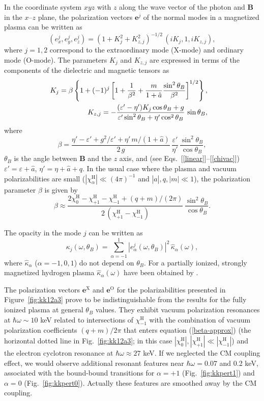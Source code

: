 \documentclass{emulateapj}
\newcommand{\beq}{\begin{equation}}
\newcommand{\eeq}{\end{equation}}
\newcommand{\bea}{\begin{eqnarray}}
\newcommand{\eea}{\end{eqnarray}}
\newcommand{\req}[1]{equation (\ref{#1})}
\newcommand{\chiH}{\chi^\mathrm{H}}
\newcommand{\eX}{\bm{e}^\mathrm{X}}
\newcommand{\eO}{\bm{e}^\mathrm{O}}
\begin{document}
In the coordinate system $xyz$ with $z$ along the wave vector 
of the photon
and $\bm{B}$ in the $x$--$z$ plane,
the polarization vectors $\bm{e}^j$
of the normal modes in a magnetized plasma
can be written as \citep{HoLai02}
\beq
  (e^j_x,e^j_y,e^j_z)=(1+K_j^2+K_{z,j}^2)^{-1/2} \,
  (i K_j, 1, i K_{z,j}),
\eeq
where $j=1,2$ correspond to the extraordinary mode (X-mode)
and ordinary mode (O-mode).
The parameters $K_j$ and $K_{z,j}$ are expressed in terms 
of the components of the dielectric and magnetic tensors as
\bea
&&\hspace*{-2em}
  K_j = \beta \left\{
   1 + (-1)^j \left[ 1 + \frac{1}{\beta^2} 
   + \frac{m}{1+\hat{a}} \frac{\sin^2\theta_B}{\beta^2}\right]^{1/2}
   \right\},
\\&&
  K_{z,j} = - \frac{ 
   (\varepsilon' - \eta') K_j \cos\theta_B + g
   }{
   \varepsilon' \sin^2\theta_B + \eta' \cos^2\theta_B } 
   \, \sin\theta_B,
\eea
where
\beq
 \beta = \frac{\eta' - \varepsilon' + g^2/\varepsilon' + \eta' \,m/(1+\hat{a})
   }{
   2 \, g }
   \, \frac{ \varepsilon'}{\eta'}
   \,\frac{\sin^2\theta_B}{\cos\theta_B},
\eeq
$\theta_B$ is the angle between $\bm{B}$ and the $z$ axis,
and (see Eqs.~[\ref{linear}]--[\ref{chivac}]) 
$\varepsilon' = \varepsilon + \hat{a}$, $\eta' = \eta + \hat{a} + q$.
In the usual case where the plasma and vacuum polarizabilities are small
($|\chiH_\alpha| \ll (4\pi)^{-1}$ and $|\hat{a}|,q,|m| \ll 1$),
the polarization parameter $\beta$ is given by
\beq
  \beta \approx \frac{2\chiH_0 - \chiH_{+1} - \chiH_{-1} + (q+m)/(2\pi)
  }{
  2\,(\chiH_{+1} - \chiH_{-1}) }\,\frac{\sin^2\theta_B}{\cos\theta_B} .
\label{beta-approx}
\eeq

The opacity in the mode $j$ can be written as
\beq
  \kappa_j(\omega,\theta_B) = \sum_{\alpha=-1}^1 \!\!
   |e_\alpha^j(\omega,\theta_B)|^2 \,\hat\kappa_\alpha(\omega),
\label{opac}
\eeq
where $\hat\kappa_\alpha$ ($\alpha=-1,0,1$) do not depend on
$\theta_B$. For a partially ionized, strongly magnetized
hydrogen plasma $\hat\kappa_\alpha(\omega)$ have been
obtained by \citet{PC03,PC04}.

The polarization vectors $\eX$ and $\eO$ for the
polarizabilities presented in Figure~\ref{fig:kk12a3} prove to be
indistinguishable from the results for the fully ionized plasma
at general $\theta_B$ values. They
exhibit vacuum polarization resonances at $\hbar\omega \sim 10$ keV
related to intersections of $\chiH_{-1}$ with the combination of vacuum
polarization coefficients $(q+m)/2\pi$ that enters \req{beta-approx}
(the horizontal dotted line in Fig.~\ref{fig:kk12a3}; in this case
$|\chiH_0|,|\chiH_{+1}|\ll|\chiH_{-1}|$) and the electron cyclotron
resonance at $\hbar\omega\approx27$ keV. If we neglected the CM
coupling effect, we would observe additional resonant features near
$\hbar\omega=0.07$ and 0.2 keV, associated with the bound-bound
transitions for $\alpha=+1$ (Fig.~\ref{fig:kkpert1}) and $\alpha=0$
(Fig.~\ref{fig:kkpert0}). 
Actually these features are smoothed away by the CM coupling.
\end{document}
